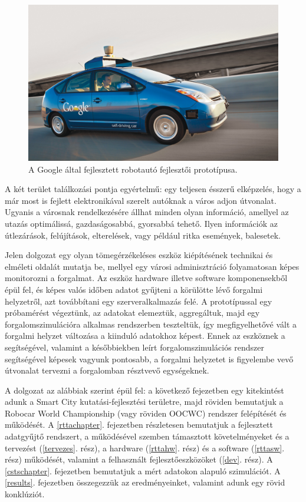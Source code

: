 \documentclass[a4paper,12pt]{report}
\begin{document}
\begin{figure}[h]
\centerline{
\includegraphics[width=6in]{img/googleauto}}
\caption{A Google által fejlesztett robotautó fejlesztői prototípusa.}
\label{googleauto}
\end{figure}

A két terület találkozási pontja egyértelmű: egy teljesen ésszerű elképzelés, hogy a már most is fejlett elektronikával szerelt autóknak a város adjon útvonalat. Ugyanis a városnak rendelkezésére állhat minden olyan információ, amellyel az utazás optimálissá, gazdaságosabbá, gyorsabbá tehető. Ilyen információk az útlezárások, felújítások, elterelések, vagy például ritka események, balesetek. 

Jelen dolgozat egy olyan tömegérzékeléses eszköz kiépítésének technikai és elméleti oldalát mutatja be, mellyel egy városi adminisztráció folyamatosan képes monitorozni a forgalmat. Az eszköz hardware illetve software komponensekből épül fel, és képes valós időben adatot gyűjteni a körülötte lévő forgalmi helyzetről, azt továbbítani egy szerveralkalmazás felé. A prototípussal egy próbamérést végeztünk, az adatokat elemeztük, aggregáltuk, majd egy forgalomszimulációra alkalmas rendszerben teszteltük, így megfigyelhetővé vált a forgalmi helyzet változása a kiinduló adatokhoz képest. Ennek az eszköznek a segítségével, valamint a későbbiekben leírt forgalomszimulációs rendszer segítségével képesek vagyunk pontosabb, a forgalmi helyzetet is figyelembe vevő útvonalat tervezni a forgalomban résztvevő egységeknek.

A dolgozat az alábbiak szerint épül fel: a következő fejezetben egy kitekintést adunk a Smart City kutatási-fejlesztési területre, majd röviden bemutatjuk a Robocar World Championship (vagy röviden OOCWC) rendszer felépítését és működését. A \ref{rttachapter}. fejezetben részletesen bemutatjuk a fejlesztett adatgyűjtő rendszert, a működésével szemben támasztott követelményeket és a tervezést (\ref{tervezes}. rész), a hardware (\ref{rttahw}. rész) és a software (\ref{rttasw}. rész) működését, valamint a felhasznált fejlesztőeszközöket (\ref{dev}. rész). A \ref{cstschapter}. fejezetben bemutatjuk a mért adatokon alapuló szimulációt. A \ref{results}. fejezetben összegezzük az eredményeinket, valamint adunk egy rövid konklúziót.
\end{document}
